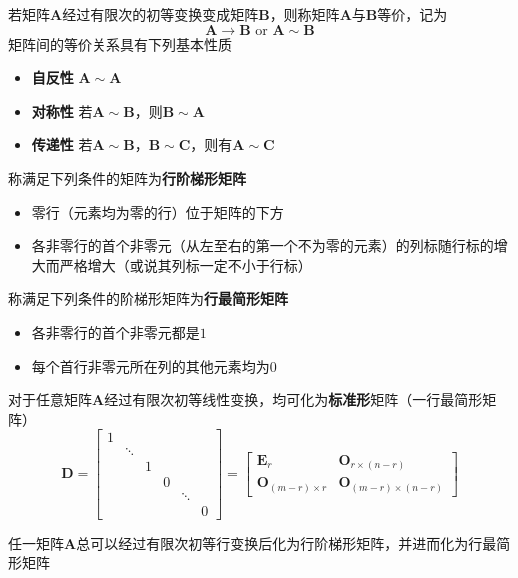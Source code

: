 \documentclass[UTF8]{ctexart}
\newcommand{\ve}[1]{{\bm{#1}}}
\newcommand{\mat}[1]{\ve{#1}}
\newcommand{\emplin}{\vspace{1em}}
\begin{document}
\emplin
\emplin

若矩阵$\mat{A}$经过有限次的初等变换变成矩阵$\mat{B}$，则称矩阵$\mat{A}$与$\mat{B}$等价，记为
\[\mat{A}\to\mat{B}\text{ or }\mat{A}\sim\mat{B}\]
矩阵间的等价关系具有下列基本性质
\begin{itemize}
  \item \textbf{自反性} $\mat{A}\sim\mat{A}$
  \item \textbf{对称性} 若$\mat{A}\sim\mat{B}$，则$\mat{B}\sim\mat{A}$
  \item \textbf{传递性} 若$\mat{A}\sim\mat{B}$，$\mat{B}\sim\mat{C}$，则有$\mat{A}\sim\mat{C}$
\end{itemize}

\emplin
\emplin

称满足下列条件的矩阵为\textbf{行阶梯形矩阵}
\begin{itemize}
  \item 零行（元素均为零的行）位于矩阵的下方
  \item 各非零行的首个非零元（从左至右的第一个不为零的元素）的列标随行标的增大而严格增大（或说其列标一定不小于行标）
\end{itemize}

\emplin
\emplin

称满足下列条件的阶梯形矩阵为\textbf{行最简形矩阵}
\begin{itemize}
  \item 各非零行的首个非零元都是$1$
  \item 每个首行非零元所在列的其他元素均为$0$
\end{itemize}

\emplin
\emplin

对于任意矩阵$\mat{A}$经过有限次初等线性变换，均可化为\textbf{标准形}矩阵（一行最简形矩阵）
\[\mat{D}=\begin{bmatrix}
1\\
&\ddots\\
&&1\\
&&&0\\
&&&&\ddots\\
&&&&&0
\end{bmatrix}=\begin{bmatrix}
\mat{E}_r&\mat{O}_{r\times(n-r)}\\
\mat{O}_{(m-r)\times r}&\mat{O}_{(m-r)\times(n-r)}
\end{bmatrix}\]

\emplin
\emplin

任一矩阵$\mat{A}$总可以经过有限次初等行变换后化为行阶梯形矩阵，并进而化为行最简形矩阵
\end{document}
